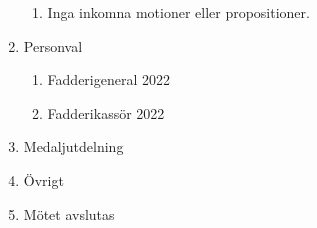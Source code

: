 \documentclass{datateknologsektionen-document}
\begin{document}
\begin{enumerate}[topsep=0pt,itemsep=1ex]
        \begin{enumerate}[label*=\arabic*.,leftmargin=3em]
          \item Inga inkomna motioner eller propositioner.
        \end{enumerate}
  \item Personval
        \begin{enumerate}[label*=\arabic*.,leftmargin=3em]
          \item Fadderigeneral 2022
          \item Fadderikassör 2022
        \end{enumerate}
  \item Medaljutdelning
  \item Övrigt
  \item Mötet avslutas
\end{enumerate}
\end{document}
